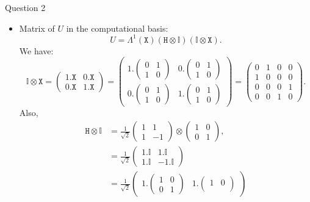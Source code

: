 \documentclass[12pt]{beamer}
\newcommand{\X}{\mathtt{X}}
\newcommand{\HH}{\mathtt{H}}
\newcommand{\I}{\mathbb{I}}
\newcommand{\eqt}[1]
{\begin{equation}#1
\end{equation}}
\newcommand{\eqtt}[1]
{\begin{equation} \begin{split}#1
\end{split}\end{equation}}
\begin{document}
\begin{frame}[allowframebreaks]{Question 2}
\begin{itemize}
\item Matrix of $U$ in the computational basis:
\eqt{U=\Lambda^1 (\X)\left( \HH\otimes\mathbb{\I}\right) \left(\I\otimes \X \right).}
We have:
\eqt{
	\I\otimes \X =
	\begin{pmatrix}
		1.\X&0.\X\\
		0.\X&1.\X
	\end{pmatrix}
	=\begin{pmatrix}
		1.\begin{pmatrix}0&1\\1&0 \end{pmatrix}&0.\begin{pmatrix}0&1\\1&0 \end{pmatrix}\\
		0.\begin{pmatrix}0&1\\1&0 \end{pmatrix}&1.\begin{pmatrix}0&1\\1&0 \end{pmatrix}
	\end{pmatrix}=
	\begin{pmatrix}
		0&1&0&0\\
		1&0&0&0\\
		0&0&0&1\\
		0&0&1&0
	\end{pmatrix}.}
Also, 
\eqtt{
	\HH\otimes\I &=\frac{1}{\sqrt{2}} \begin{pmatrix}
		1&1\\
		1&-1
	\end{pmatrix}\otimes\begin{pmatrix}
		1&0\\
		0&1
	\end{pmatrix},\\
	&=\frac{1}{\sqrt{2}} \begin{pmatrix}
		1.\I&1.\I\\
		1.\I&-1.\I
	\end{pmatrix}\\&=\frac{1}{\sqrt{2}}\begin{pmatrix}1.\begin{pmatrix}
			1&0\\
			0&1
		\end{pmatrix}&
		1.\begin{pmatrix}
			1&0\\

\end{pmatrix}
\end{pmatrix}}
\end{itemize}
\end{frame}
\end{document}
